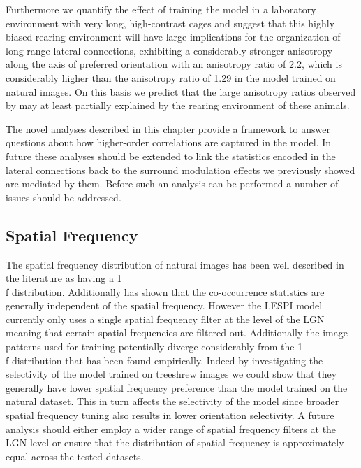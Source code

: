 Furthermore we quantify the effect of training the model in a
laboratory environment with very long, high-contrast cages and suggest
that this highly biased rearing environment will have large
implications for the organization of long-range lateral connections,
exhibiting a considerably stronger anisotropy along the axis of
preferred orientation with an anisotropy ratio of 2.2, which is
considerably higher than the anisotropy ratio of 1.29 in the model
trained on natural images. On this basis we predict that the large
anisotropy ratios observed by \citep{Bosking1997} may at least
partially explained by the rearing environment of these animals.

The novel analyses described in this chapter provide a framework to
answer questions about how higher-order correlations are captured in
the model. In future these analyses should be extended to link the
statistics encoded in the lateral connections back to the surround
modulation effects we previously showed are mediated by them. Before
such an analysis can be performed a number of issues should be
addressed.

\subsection{Spatial Frequency}

The spatial frequency distribution of natural images has been well
described in the literature as having a 1\\f
distribution. Additionally \cite{Perrinet2015} has shown that the
co-occurrence statistics are generally independent of the spatial
frequency. However the LESPI model currently only uses a single
spatial frequency filter at the level of the LGN meaning that certain
spatial frequencies are filtered out. Additionally the image patterns
used for training potentially diverge considerably from the 1\\f
distribution that has been found empirically. Indeed by investigating
the selectivity of the model trained on treeshrew images we could show
that they generally have lower spatial frequency preference than the
model trained on the natural dataset. This in turn affects the
selectivity of the model since broader spatial frequency tuning also
results in lower orientation selectivity. A future analysis should
either employ a wider range of spatial frequency filters at the LGN
level or ensure that the distribution of spatial frequency is
approximately equal across the tested datasets.

